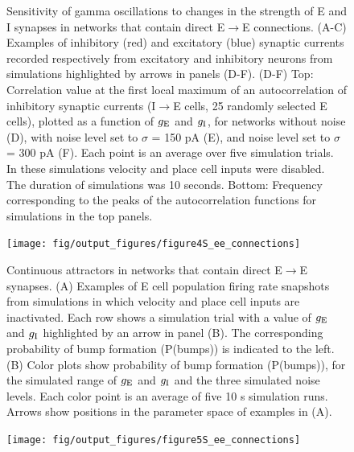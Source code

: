 \documentclass[a4paper,12pt]{article}
\newcommand{\ssc}[3]{\ensuremath{#1_{\text{#2}_{\text{#3}}}}}
\newcommand{\gE      }{\ssc{g}      {\scriptsize{E}}{}}
\newcommand{\gI      }{\ssc{g}      {\scriptsize{I}}{}}
\begin{document}
\clearpage

\begin{figure}[H]
    \internallinenumbers
    \caption{Sensitivity of gamma oscillations to changes in the strength of E
    and I synapses in networks that contain direct E$\rightarrow$E connections.
    (A-C) Examples of inhibitory (red) and excitatory (blue) synaptic currents
    recorded respectively from excitatory and inhibitory neurons from
    simulations highlighted by arrows in panels (D-F).  (D-F) Top: Correlation
    value at the first local maximum of an autocorrelation of inhibitory
    synaptic currents (I$\rightarrow$E cells, 25 randomly selected E cells),
    plotted as a function of $\gE$ and $\gI$, for networks without noise (D), with
    noise level set to $\sigma$ = 150 pA (E), and noise level set to $\sigma$ =
    300 pA (F). Each point is an average over five simulation trials. In these
    simulations velocity and place cell inputs were disabled.  The duration of
    simulations was 10 seconds.  Bottom: Frequency corresponding to the peaks
    of the autocorrelation functions for simulations in the top panels.}
\end{figure}

\clearpage

\begin{figure}[p]
    \internallinenumbers
    \centering
        \texttt{[image: fig/output\_figures/figure4S\_ee\_connections]}
    \caption{Continuous attractors in networks that contain direct
    E$\rightarrow$E synapses. (A) Examples of E cell population firing rate
    snapshots from simulations in which velocity and place cell inputs are
    inactivated. Each row shows a simulation trial with a value of $\gE$ and
    $\gI$
    highlighted by an arrow in panel (B). The corresponding probability of bump
    formation (P(bumps)) is indicated to the left.  (B) Color plots show
    probability of bump formation (P(bumps)), for the simulated range of $\gE$ and
    $\gI$ and the three simulated noise levels. Each color point is an average of
    five 10 s simulation runs. Arrows show positions in the parameter space of
    examples in (A).}
\end{figure}

\clearpage

\begin{figure}[p]
    \internallinenumbers
    \centering
        \texttt{[image: fig/output\_figures/figure5S\_ee\_connections]}
\end{figure}

\clearpage
\end{document}
